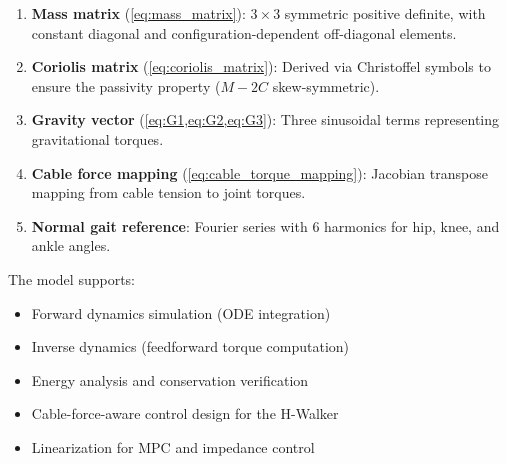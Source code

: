 \documentclass[11pt,a4paper]{article}
\newcommand{\vc}[1]{\bm{#1}}
\newcommand{\mat}[1]{\bm{#1}}
\newcommand{\dt}[1]{\dot{#1}}
\def\vc#1{#1}%
\def\mat#1{#1}%
\def\dt#1{#1}%
\def\bm#1{#1}%
\begin{document}
\begin{enumerate}
    \item \textbf{Mass matrix} (\cref{eq:mass_matrix}): $3 \times 3$ symmetric
          positive definite, with constant diagonal and configuration-dependent
          off-diagonal elements.
    \item \textbf{Coriolis matrix} (\cref{eq:coriolis_matrix}): Derived via
          Christoffel symbols to ensure the passivity property
          ($\dt{\mat{M}} - 2\vc{C}$ skew-symmetric).
    \item \textbf{Gravity vector} (\cref{eq:G1,eq:G2,eq:G3}): Three
          sinusoidal terms representing gravitational torques.
    \item \textbf{Cable force mapping} (\cref{eq:cable_torque_mapping}):
          Jacobian transpose mapping from cable tension to joint torques.
    \item \textbf{Normal gait reference}: Fourier series with 6 harmonics
          for hip, knee, and ankle angles.
\end{enumerate}

The model supports:
\begin{itemize}
    \item Forward dynamics simulation (ODE integration)
    \item Inverse dynamics (feedforward torque computation)
    \item Energy analysis and conservation verification
    \item Cable-force-aware control design for the H-Walker
    \item Linearization for MPC and impedance control
\end{itemize}
\end{document}

